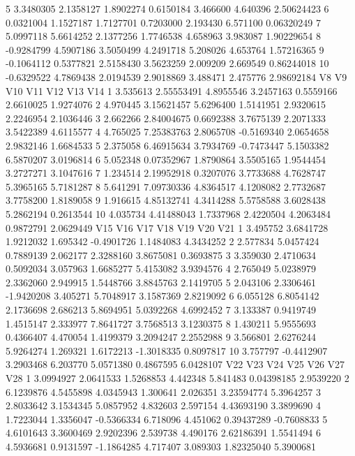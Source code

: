 \documentclass[12pt]{article}
\begin{document}
\begin{Schunk}
\begin{Soutput}
5   3.3480305 2.1358127  1.8902274 0.6150184 3.466600 4.640396 2.50624423
6   0.0321004 1.1527187  1.7127701 0.7203000 2.193430 6.571100 0.06320249
7   5.0997118 5.6614252  2.1377256 1.7746538 4.658963 3.983087 1.90229654
8  -0.9284799 4.5907186  3.5050499 4.2491718 5.208026 4.653764 1.57216365
9  -0.1064112 0.5377821  2.5158430 3.5623259 2.009209 2.669549 0.86244018
10 -0.6329522 4.7869438  2.0194539 2.9018869 3.488471 2.475776 2.98692184
         V8         V9       V10        V11       V12       V13       V14
1  3.535613 2.55553491 4.8955546  3.2457163 0.5559166 2.6610025 1.9274076
2  4.970445 3.15621457 5.6296400  1.5141951 2.9320615 2.2246954 2.1036446
3  2.662266 2.84004675 0.6692388  3.7675139 2.2071333 3.5422389 4.6115577
4  4.765025 7.25383763 2.8065708 -0.5169340 2.0654658 2.9832146 1.6684533
5  2.375058 6.46915634 3.7934769 -0.7473447 5.1503382 6.5870207 3.0196814
6  5.052348 0.07352967 1.8790864  3.5505165 1.9544454 3.2727271 3.1047616
7  1.234514 2.19952918 0.3207076  3.7733688 4.7628747 5.3965165 5.7181287
8  5.641291 7.09730336 4.8364517  4.1208082 2.7732687 3.7758200 1.8189058
9  1.916615 4.85132741 4.3414288  5.5758588 3.6028438 5.2862194 0.2613544
10 4.035734 4.41488043 1.7337968  2.4220504 4.2063484 0.9872791 2.0629449
        V15        V16        V17      V18        V19        V20       V21
1  3.495752  3.6841728  1.9212032 1.695342 -0.4901726  1.1484083 4.3434252
2  2.577834  5.0457424  0.7889139 2.062177  2.3288160  3.8675081 0.3693875
3  3.359030  2.4710634  0.5092034 3.057963  1.6685277  5.4153082 3.9394576
4  2.765049  5.0238979  2.3362060 2.949915  1.5448766  3.8845763 2.1419705
5  2.043106  2.3306461 -1.9420208 3.405271  5.7048917  3.1587369 2.8219092
6  6.055128  6.8054142  2.1736698 2.686213  5.8694951  5.0392268 4.6992452
7  3.133387  0.9419749  1.4515147 2.333977  7.8641727  3.7568513 3.1230375
8  1.430211  5.9555693  0.4366407 4.470054  1.4199379  3.2094247 2.2552988
9  3.566801  2.6276244  5.9264274 1.269321  1.6172213 -1.3018335 0.8097817
10 3.757797 -0.4412907  3.2903468 6.203770  5.0571380  0.4867595 6.0428107
         V22       V23        V24      V25      V26        V27        V28
1  3.0994927 2.0641533  1.5268853 4.442348 5.841483 0.04398185  2.9539220
2  6.1239876 4.5455898  4.0345943 1.300641 2.026351 3.23594774  5.3964257
3  2.8033642 3.1534345  5.0857952 4.832603 2.597154 4.43693190  3.3899690
4  1.7223044 1.3356047 -0.5366334 6.718096 4.451062 0.39437289 -0.7608833
5  4.6101643 3.3600469  2.9202396 2.539738 4.490176 2.62186391  1.5541494
6  4.5936681 0.9131597 -1.1864285 4.717407 3.089303 1.82325040  5.3900681

\end{Soutput}
\end{Schunk}
\end{document}
